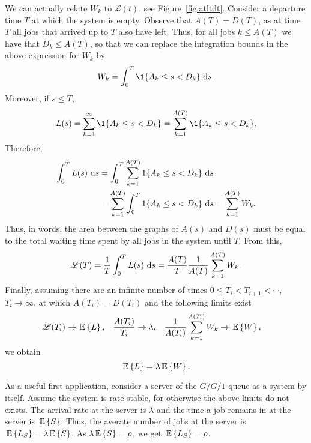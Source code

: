 We can actually relate $W_k$ to $ \mathscr{L}(t)$, see
Figure~\ref{fig:atltdt}. Consider a departure time $T$ at which the
system is empty. Observe that $A(T) = D(T)$, as at time $T$ all jobs
that arrived up to $T$ also have left. Thus, for all jobs $k\leq A(T)$
we have that $D_k \leq A(T)$, so that we can replace the integration
bounds in the above expression for $W_k$ by
\begin{equation*}
  W_k = \int_0^T \1{A_k \leq s < D_k}\,\d s.
\end{equation*}
Moreover, if $s\leq T$,
\begin{equation*}
L(s) = \sum_{k=1}^\infty \1{A_k \leq s < D_k} = \sum_{k=1}^{A(T)}\1{A_k \leq s < D_k}.
\end{equation*}
Therefore,
\begin{equation*}
  \begin{split}
  \int_0^T L(s)\, \,\text{d}s & = \int_0^T \sum_{k=1}^{A(T)} 1\{A_k \leq s < D_k\} \, \,\text{d}s \\
& =  \sum_{k=1}^{A(T)}\int_0^T  1\{A_k \leq s < D_k\} \, \,\text{d}s =  \sum_{k=1}^{A(T)} W_k.
  \end{split}
\end{equation*}
Thus, in words, the area between the graphs of $A(s)$ and $D(s)$ must
be equal to the total waiting time spent by all jobs in the system
until $T$. 
From this, 
\begin{equation*}
  \mathscr{L}(T) = \frac 1 T  \int_0^T L(s)\, \,\text{d}s  = \frac{A(T)} T \frac{1}{A(T)} \sum_{k=1}^{A(T)} W_k.
\end{equation*}
Finally, assuming there are an infinite number of times
$0\leq T_i<T_{i+1}<\cdots$, $T_i\to\infty$, at which $A(T_i) = D(T_i)$
and the following limits exist
\begin{align*}
 \mathscr{L}(T_i) &\to \,\mathbb{E}\left\{L\right\},&
\frac{A(T_i)}{T_i} &\to \lambda, &
\frac{1}{A(T_i)} \sum_{k=1}^{A(T_i)} W_k &\to \,\mathbb{E}\left\{W\right\},
\end{align*}
we obtain 
\begin{equation*}
\,\mathbb{E}\left\{L\right\} = \lambda \,\mathbb{E}\left\{W\right\}.
\end{equation*}

As a useful first application, consider a server of the $G/G/1$ queue
as a system by itself. Assume the system is rate-stable, for otherwise
the above limits do not exists.  The arrival rate at the server is
$\lambda$ and the time a job remains in at the server is $\,\mathbb{E}\left\{S\right\}$.
Thus, the averate number of jobs at the server is
$\,\mathbb{E}\left\{L_S\right\} = \lambda \,\mathbb{E}\left\{S\right\}$. As $\lambda \,\mathbb{E}\left\{S\right\} = \rho$, we get
$\,\mathbb{E}\left\{L_S\right\} = \rho$.

